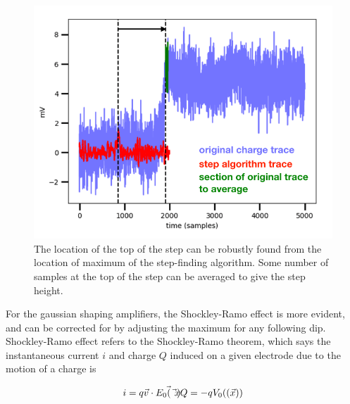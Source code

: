  \begin{figure}[htbp]
\begin{center}
\includegraphics[width =\textwidth ]{figures/testbed/charge_algorithm.png}
\caption{The location of the top of the step can be robustly found from the location of maximum of the step-finding algorithm. Some number of samples at the top of the step can be averaged to give the step height. }
\label{fig:charge_algorithm}
\end{center}
\end{figure}


For the gaussian shaping amplifiers, the Shockley-Ramo effect is more evident, and can be corrected for by adjusting the maximum for any following dip. Shockley-Ramo effect refers to the Shockley-Ramo theorem, which says the instantaneous current $i$ and charge $Q$ induced on a given electrode due to the motion of a charge is

\begin{equation}
i = q\vec{v} \cdot \vec{E_{0}(\vec{x})} \\
Q = -q V_{0}((\vec{x}))
\end{equation}

